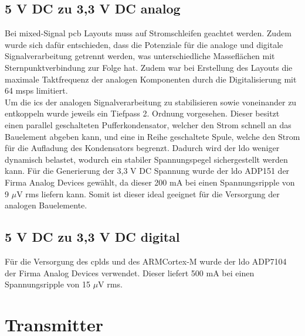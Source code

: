 \subsection*{5 V DC zu 3,3 V DC analog}
Bei mixed-Signal \ac{pcb} Layouts muss auf Stromschleifen geachtet werden. Zudem wurde sich dafür entschieden, dass die Potenziale für die analoge und digitale Signalverarbeitung getrennt werden, was unterschiedliche Masseflächen mit Sternpunktverbindung zur Folge hat. Zudem war bei Erstellung des Layouts die maximale Taktfrequenz der analogen Komponenten durch die Digitalisierung mit 64 \ac{msps} limitiert.\\
Um die \ac{ic}s der analogen Signalverarbeitung zu stabilisieren sowie voneinander zu entkoppeln wurde jeweils ein Tiefpass 2. Ordnung vorgesehen. Dieser besitzt einen parallel geschalteten Pufferkondensator, welcher den Strom schnell an das Bauelement abgeben kann, und eine in Reihe geschaltete Spule, welche den Strom für die Aufladung des Kondensators begrenzt. Dadurch wird der \ac{ldo} weniger dynamisch belastet, wodurch ein stabiler Spannungspegel sichergestellt werden kann. Für die Generierung der 3,3 V DC Spannung wurde der \ac{ldo} ADP151 der Firma Analog Devices gewählt, da dieser 200 mA bei einen Spannungsripple von 9 $\mu$V rms liefern kann. Somit ist dieser ideal geeignet für die Versorgung der analogen Bauelemente.
%
%
\subsection*{5 V DC zu 3,3 V DC digital}
Für die Versorgung des \ac{cpld}s und des ARM\SymbReg Cortex\SymbReg-M wurde der \ac{ldo} ADP7104 der Firma Analog Devices verwendet. Dieser liefert 500 mA bei einen Spannungsripple von 15 $\mu$V rms.
\newpage
\section{Transmitter}\label{sec:transmitter}
\newpage
